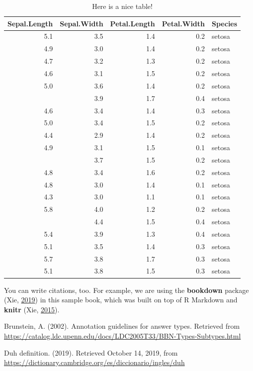 \documentclass[12pt,a4paper,]{scrartcl}
\begin{document}
\begin{table}

\caption{\label{tab:nice-tab}Here is a nice table!}
\centering
\begin{tabular}[t]{rrrrl}
\toprule
Sepal.Length & Sepal.Width & Petal.Length & Petal.Width & Species\\
\midrule
5.1 & 3.5 & 1.4 & 0.2 & setosa\\
4.9 & 3.0 & 1.4 & 0.2 & setosa\\
4.7 & 3.2 & 1.3 & 0.2 & setosa\\
4.6 & 3.1 & 1.5 & 0.2 & setosa\\
5.0 & 3.6 & 1.4 & 0.2 & setosa\\
\addlinespace
5.4 & 3.9 & 1.7 & 0.4 & setosa\\
4.6 & 3.4 & 1.4 & 0.3 & setosa\\
5.0 & 3.4 & 1.5 & 0.2 & setosa\\
4.4 & 2.9 & 1.4 & 0.2 & setosa\\
4.9 & 3.1 & 1.5 & 0.1 & setosa\\
\addlinespace
5.4 & 3.7 & 1.5 & 0.2 & setosa\\
4.8 & 3.4 & 1.6 & 0.2 & setosa\\
4.8 & 3.0 & 1.4 & 0.1 & setosa\\
4.3 & 3.0 & 1.1 & 0.1 & setosa\\
5.8 & 4.0 & 1.2 & 0.2 & setosa\\
\addlinespace
5.7 & 4.4 & 1.5 & 0.4 & setosa\\
5.4 & 3.9 & 1.3 & 0.4 & setosa\\
5.1 & 3.5 & 1.4 & 0.3 & setosa\\
5.7 & 3.8 & 1.7 & 0.3 & setosa\\
5.1 & 3.8 & 1.5 & 0.3 & setosa\\
\bottomrule
\end{tabular}
\end{table}

You can write citations, too. For example, we are using the \textbf{bookdown} package (Xie, \protect\hyperlink{ref-R-bookdown}{2019}) in this sample book, which was built on top of R Markdown and \textbf{knitr} (Xie, \protect\hyperlink{ref-xie2015}{2015}).

\hypertarget{refs}{}
\leavevmode\hypertarget{ref-brunstein2002}{}%
Brunstein, A. (2002). Annotation guidelines for answer types. Retrieved from \url{https://catalog.ldc.upenn.edu/docs/LDC2005T33/BBN-Types-Subtypes.html}

\leavevmode\hypertarget{ref-cambridge_duh}{}%
Duh definition. (2019). Retrieved October 14, 2019, from \url{https://dictionary.cambridge.org/es/diccionario/ingles/duh}
\end{document}
